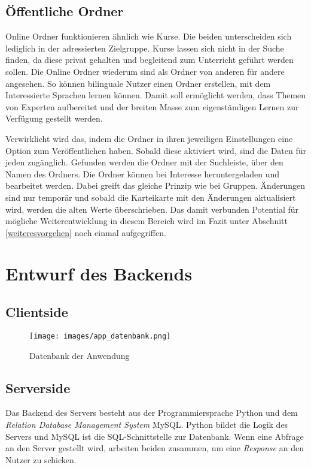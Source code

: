 \subsection{Öffentliche Ordner}
Online Ordner funktionieren ähnlich wie Kurse. Die beiden unterscheiden sich lediglich in der adressierten Zielgruppe. Kurse lassen sich nicht in der Suche finden, da diese privat gehalten und begleitend zum Unterricht geführt werden sollen. Die Online Ordner wiederum sind als Ordner von anderen für andere angesehen. So können bilinguale Nutzer einen Ordner erstellen, mit dem Interessierte Sprachen lernen können. Damit soll ermöglicht werden, dass Themen von Experten aufbereitet und der breiten Masse zum eigenständigen Lernen zur Verfügung gestellt werden.

Verwirklicht wird das, indem die Ordner in ihren jeweiligen Einstellungen eine Option zum Veröffentlichen haben. Sobald diese aktiviert wird, sind die Daten für jeden zugänglich. Gefunden werden die Ordner mit der Suchleiste, über den Namen des Ordners. Die Ordner können bei Interesse heruntergeladen und bearbeitet werden. Dabei greift das gleiche Prinzip wie bei Gruppen. Änderungen sind nur temporär und sobald die Karteikarte mit den Änderungen aktualisiert wird, werden die alten Werte überschrieben. Das damit verbunden Potential für mögliche Weiterentwicklung in diesem Bereich wird im Fazit unter Abschnitt \ref{weiteresvorgehen} noch einmal aufgegriffen.


\section{Entwurf des Backends}

\subsection{Clientside}
\begin{figure}[ht!]
    \centering
    \texttt{[image: images/app\_datenbank.png]}
    \caption{Datenbank der Anwendung}
    \label{fig:appdatabase}
\end{figure}

\subsection{Serverside}
Das Backend des Servers besteht aus der Programmiersprache Python und dem \textit{Relation Database Management System} MySQL. Python bildet die Logik des Servers und MySQL ist die SQL-Schnittstelle zur Datenbank. Wenn eine Abfrage an den Server gestellt wird, arbeiten beiden zusammen, um eine \textit{Response} an den Nutzer zu schicken.

